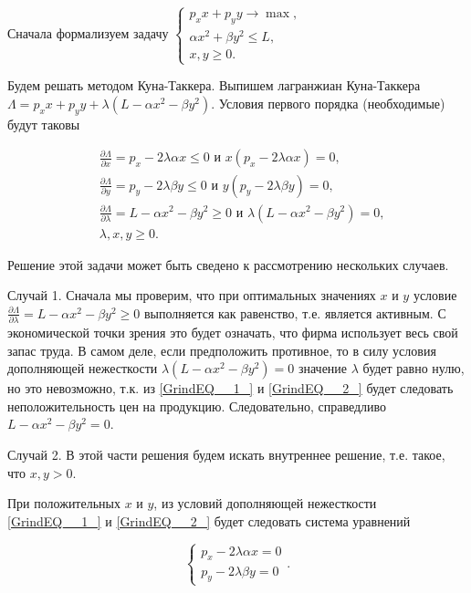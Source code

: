 \begin{solution}
Сначала формализуем задачу $\left\{\begin{array}{c} {p_{x} x+p_{y} y\to \max ,} \\ {\alpha x^{2} +\beta y^{2} \le L,} \\ {x,y\ge 0.} \end{array}\right. $

Будем решать методом Куна-Таккера. Выпишем лагранжиан Куна-Таккера $\Lambda =p_{x} x+p_{y} y+\lambda (L-\alpha x^{2} -\beta y^{2} )$. Условия первого порядка (необходимые) будут таковы

\begin{align}
\label{GrindEQ__1_} & \frac{\partial \Lambda }{\partial x} =p_{x} -2\lambda \alpha x\le 0 \text{ и } x(p_{x} -2\lambda \alpha x)=0, \\
\label{GrindEQ__2_}  & \frac{\partial \Lambda }{\partial y} =p_{y} -2\lambda \beta y\le 0 \text{ и } y(p_{y} -2\lambda \beta y)=0, \\
\label{GrindEQ__3_}  & \frac{\partial \Lambda }{\partial \lambda } =L-\alpha x^{2} -\beta y^{2} \ge 0 \text{ и } \lambda (L-\alpha x^{2} -\beta y^{2} )=0, \\
\label{GrindEQ__4_}  & \lambda ,x,y\ge 0. 
\end{align}


Решение этой задачи может быть сведено к рассмотрению нескольких случаев.

Случай 1. Сначала мы проверим, что при оптимальных значениях $x$ и $y$ условие $\frac{\partial \Lambda }{\partial \lambda } =L-\alpha x^{2} -\beta y^{2} \ge 0$ выполняется как равенство, т.е. является активным. С экономической точки зрения это будет означать, что фирма использует весь свой запас труда. В самом деле, если предположить противное, то в силу условия дополняющей нежесткости $\lambda (L-\alpha x^{2} -\beta y^{2} )=0$ значение $\lambda $ будет равно нулю, но это невозможно, т.к. из \ref{GrindEQ__1_} и \ref{GrindEQ__2_} будет следовать неположительность цен на продукцию. Следовательно, справедливо  $L-\alpha x^{2} -\beta y^{2} =0$.

Случай 2. В этой части решения будем искать внутреннее решение, т.е. такое, что $x,y>0$.

При положительных $x$ и $y$, из условий дополняющей нежесткости \ref{GrindEQ__1_} и \ref{GrindEQ__2_} будет следовать система уравнений

\begin{equation}
\begin{cases}
p_{x} -2\lambda \alpha x=0 \\
p_{y} -2\lambda \beta y=0
\end{cases}.
\end{equation} 


\end{solution}
